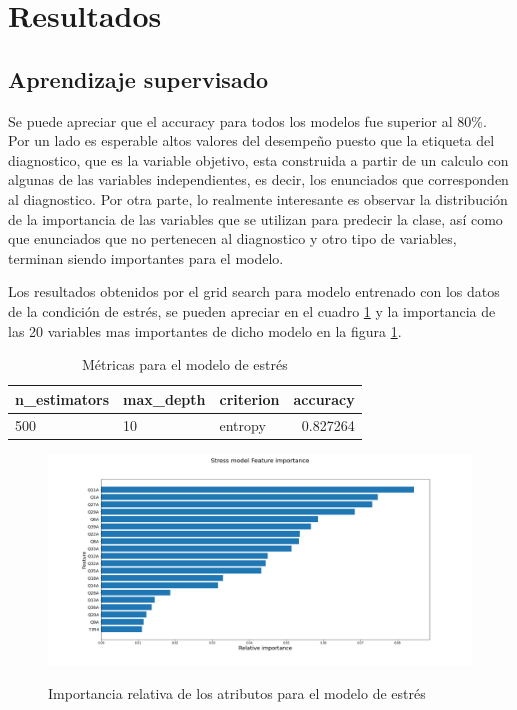 \section{Resultados}

\subsection{Aprendizaje supervisado}

Se puede apreciar que el accuracy para todos los modelos fue superior al 80\%. Por un lado es esperable altos valores del desempeño puesto que la etiqueta del diagnostico, que es la variable objetivo, esta construida a partir de un calculo con algunas de las variables independientes, es decir, los enunciados que corresponden al diagnostico. Por otra parte, lo realmente interesante es observar la distribución de la importancia de las variables que se utilizan para predecir la clase, así como que enunciados que no pertenecen al diagnostico y otro tipo de variables, terminan siendo importantes para el modelo.


Los resultados obtenidos por el grid search para modelo entrenado con los datos de la condición de estrés, se pueden apreciar en el cuadro \ref{table:modelo_estres} y la  importancia de las 20 variables mas importantes de dicho modelo en la figura \ref{variables_estress}.

\begin{table}[ht]
\centering
\caption{Métricas para el modelo de estrés}
\begin{tabular}{lllr}
\toprule
n\_estimators & max\_depth & criterion &  accuracy \\
\midrule
500 & 10 & entropy & 0.827264 \\
\bottomrule
\end{tabular}
\label{table:modelo_estres}
\end{table}%

\begin{figure}[h]
\caption{Importancia relativa de los atributos para el modelo de estrés}
\centering
\includegraphics[width=\textwidth,height=\textheight,keepaspectratio]{Media/Pictures/Stress model Feature importance.png} 
\label{variables_estress}
\end{figure}



